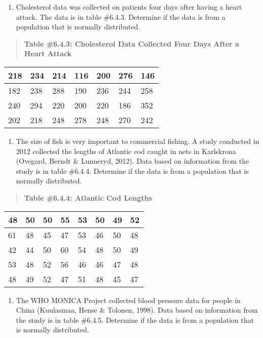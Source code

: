 \documentclass[]{book}
\providecommand{\tightlist}{%
  \setlength{\itemsep}{0pt}\setlength{\parskip}{0pt}}
\begin{document}
\begin{enumerate}
\def\labelenumi{\arabic{enumi}.}
\tightlist
\item
  Cholesterol data was collected on patients four days after having a heart attack. The data is in table \#6.4.3. Determine if the data is from a population that is normally distributed.
\end{enumerate}

\begin{quote}
\textbf{Table \#6.4.3: Cholesterol Data Collected Four Days After a Heart Attack}
\end{quote}

\begin{longtable}[]{@{}lllllll@{}}
\toprule
218 & 234 & 214 & 116 & 200 & 276 & 146\tabularnewline
\midrule
\endhead
182 & 238 & 288 & 190 & 236 & 244 & 258\tabularnewline
240 & 294 & 220 & 200 & 220 & 186 & 352\tabularnewline
202 & 218 & 248 & 278 & 248 & 270 & 242\tabularnewline
\bottomrule
\end{longtable}

\begin{enumerate}
\def\labelenumi{\arabic{enumi}.}
\setcounter{enumi}{1}
\tightlist
\item
  The size of fish is very important to commercial fishing. A study conducted in 2012 collected the lengths of Atlantic cod caught in nets in Karlskrona (Ovegard, Berndt \& Lunneryd, 2012). Data based on information from the study is in table \#6.4.4. Determine if the data is from a population that is normally distributed.
\end{enumerate}

\begin{quote}
\textbf{Table \#6.4.4: Atlantic Cod Lengths}
\end{quote}

\begin{longtable}[]{@{}llllllll@{}}
\toprule
48 & 50 & 50 & 55 & 53 & 50 & 49 & 52\tabularnewline
\midrule
\endhead
61 & 48 & 45 & 47 & 53 & 46 & 50 & 48\tabularnewline
42 & 44 & 50 & 60 & 54 & 48 & 50 & 49\tabularnewline
53 & 48 & 52 & 56 & 46 & 46 & 47 & 48\tabularnewline
48 & 49 & 52 & 47 & 51 & 48 & 45 & 47\tabularnewline
\bottomrule
\end{longtable}

\begin{enumerate}
\def\labelenumi{\arabic{enumi}.}
\setcounter{enumi}{2}
\tightlist
\item
  The WHO MONICA Project collected blood pressure data for people in China (Kuulasmaa, Hense \& Tolonen, 1998). Data based on information from the study is in table \#6.4.5. Determine if the data is from a population that is normally distributed.
\end{enumerate}
\end{document}
